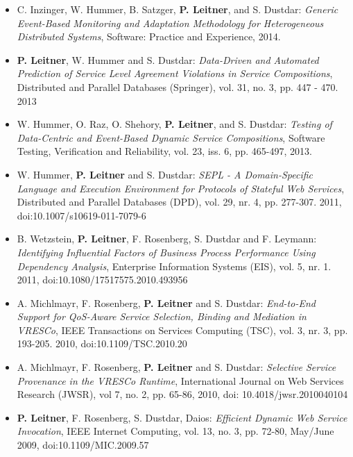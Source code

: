 \documentclass[paper=letter,fontsize=11pt]{scrartcl} %
\begin{document}
\begin{itemize}
  \item C. Inzinger, W. Hummer, B. Satzger, \textbf{P. Leitner}, and S. Dustdar: \emph{Generic Event-Based Monitoring and Adaptation Methodology for Heterogeneous Distributed Systems}, Software: Practice and Experience, 2014.
  \item \textbf{P. Leitner}, W. Hummer and S. Dustdar: \emph{Data-Driven and Automated Prediction of Service Level Agreement Violations in Service Compositions}, Distributed and Parallel Databases (Springer), vol. 31, no. 3, pp. 447 - 470. 2013
  \item W. Hummer, O. Raz, O. Shehory, \textbf{P. Leitner}, and S. Dustdar: \emph{Testing of Data-Centric and Event-Based Dynamic Service Compositions}, Software Testing, Verification and Reliability, vol. 23, iss. 6, pp. 465-497, 2013.
\item W. Hummer, \textbf{P. Leitner} and S. Dustdar: \emph{SEPL - A
Domain-Specific Language and Execution Environment for Protocols of Stateful Web
Services}, Distributed and Parallel Databases (DPD), vol. 29, nr. 4, pp.
277-307. 2011, doi:10.1007/s10619-011-7079-6
\item B. Wetzstein, \textbf{P. Leitner}, F. Rosenberg, S. Dustdar and F. Leymann: \emph{Identifying Influential Factors of Business Process Performance Using Dependency Analysis}, Enterprise Information Systems (EIS), vol. 5, nr. 1. 2011, doi:10.1080/17517575.2010.493956
\item A. Michlmayr, F. Rosenberg, \textbf{P. Leitner} and S. Dustdar: \emph{End-to-End Support for QoS-Aware Service Selection, Binding and Mediation in VRESCo}, IEEE Transactions on Services Computing (TSC), vol. 3, nr. 3, pp. 193-205. 2010, doi:10.1109/TSC.2010.20
\item A. Michlmayr, F. Rosenberg, \textbf{P. Leitner} and S. Dustdar: \emph{Selective Service Provenance in the VRESCo Runtime}, International Journal on Web Services Research (JWSR), vol 7, no. 2, pp. 65-86, 2010, doi: 10.4018/jwsr.2010040104
\item \textbf{P. Leitner}, F. Rosenberg, S. Dustdar, Daios: \emph{Efficient Dynamic Web Service Invocation}, IEEE Internet Computing, vol. 13, no. 3, pp. 72-80, May/June 2009, doi:10.1109/MIC.2009.57
\end{itemize}
\end{document}
